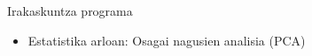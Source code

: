 \documentclass[
 10pt,%
 compress,%
 t,       %
 xcolor=svgnames
]{beamer}
\theoremstyle{definition} \newtheorem{definicion}{Definicion}[section]
\theoremstyle{propiedades} \newtheorem{propiedades}{Propiedades}[section]
\begin{document}
\begin{frame}{Irakaskuntza programa}
{\begin{itemize}
\begin{itemize}
\begin{itemize}
	\item Irudien konpresioa
	\item Aurpegien errekonozimendua
\end{itemize}		
		
		\item Estatistika arloan: Osagai nagusien analisia (PCA)
	\end{itemize}
\end{itemize}




}

\end{frame}


\end{document}
